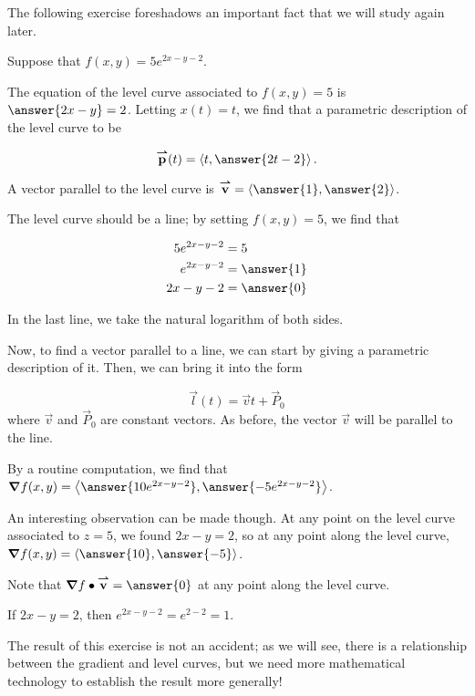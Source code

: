 \documentclass{ximera}
\author{Jim Talamo}
\begin{document}
\begin{exercise}
The following exercise foreshadows an important fact that we will study again later.

Suppose that $f(x,y) =5e^{2x-y-2}$.  

The equation of the level curve associated to $f(x,y)=5$ is $\answer{2x-y} = 2$.  Letting $x(t)=t$, we find that a parametric description of the level curve to be 

\[
\vec{p}(t) = \vector{t, \answer{2t-2}}.
\]

A vector parallel to the level curve is $\vec{v} = \vector{\answer{1},\answer{2}}$.

\begin{hint}
The level curve should be a line; by setting $f(x,y)=5$, we find that 

\begin{align*}
5e^{2x-y-2} &=5 \\
e^{2x-y-2} &= \answer{1} \\
2x-y-2 &= \answer{0} 
\end{align*}

In the last line, we take the natural logarithm of both sides.  

Now, to find a vector parallel to a line, we can start by giving a parametric description of it.  Then, we can bring it into the form

\[
\vec{l}(t) = \vec{v}t+\vec{P}_0
\]
where $\vec{v}$ and $\vec{P}_0$ are constant vectors.  As before, the vector $\vec{v}$ will be parallel to the line.
\end{hint}

\begin{exercise}
By a routine computation, we find that $\grad{f}(x,y) = \vector{\answer{10e^{2x-y-2}}, \answer{-5e^{2x-y-2}} }$.

An interesting observation can be made though.  At any point on the level curve associated to $z=5$, we found $2x-y=2$, so at any point along the level curve, $\grad{f}(x,y) = \vector{\answer{10}, \answer{-5} }$.

Note that $\grad{f} \dotp \vec{v} = \answer{0}$ at any point along the level curve.

\begin{hint}
If $2x-y=2$, then $e^{2x-y-2} = e^{2-2} =1$.
\end{hint}

\begin{feedback}[correct]
The result of this exercise is not an accident; as we will see, there is a relationship between the gradient and level curves, but we need more mathematical technology to establish the result more generally!
\end{feedback}

\end{exercise}
\end{exercise}
\end{document}
